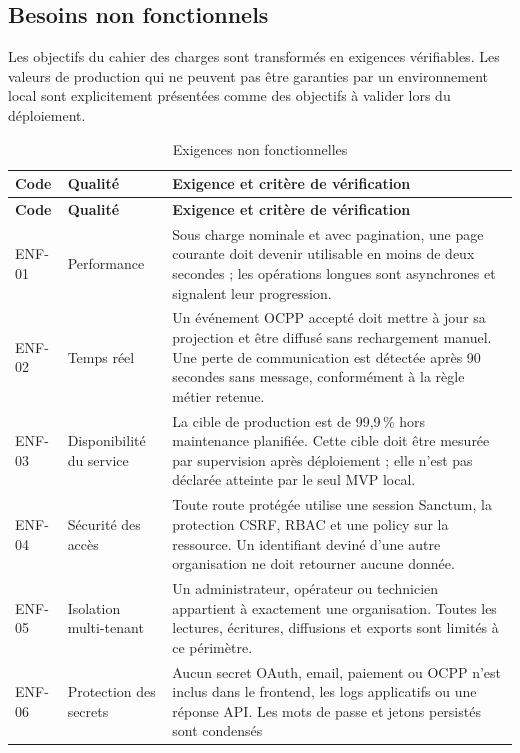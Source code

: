 \subsection{Besoins non fonctionnels}

Les objectifs du cahier des charges sont transformés en exigences vérifiables. Les
valeurs de production qui ne peuvent pas être garanties par un environnement local
sont explicitement présentées comme des objectifs à valider lors du déploiement.

\begin{longtable}{|C{1.45cm}|C{3.0cm}|p{9.2cm}|}
  \caption{Exigences non fonctionnelles}
  \label{tab:non-functional-requirements}\\
  \hline
  \textbf{Code} & \textbf{Qualité} & \textbf{Exigence et critère de vérification}\\
  \hline
  \endfirsthead
  \hline
  \textbf{Code} & \textbf{Qualité} & \textbf{Exigence et critère de vérification}\\
  \hline
  \endhead
  ENF-01 & Performance &
  Sous charge nominale et avec pagination, une page courante doit devenir utilisable
  en moins de deux secondes ; les opérations longues sont asynchrones et signalent
  leur progression.\\\hline
  ENF-02 & Temps réel &
  Un événement OCPP accepté doit mettre à jour sa projection et être diffusé sans
  rechargement manuel. Une perte de communication est détectée après 90 secondes
  sans message, conformément à la règle métier retenue.\\\hline
  ENF-03 & Disponibilité du service &
  La cible de production est de 99,9\,\% hors maintenance planifiée. Cette cible doit
  être mesurée par supervision après déploiement ; elle n'est pas déclarée atteinte
  par le seul MVP local.\\\hline
  ENF-04 & Sécurité des accès &
  Toute route protégée utilise une session Sanctum, la protection CSRF, RBAC et une
  policy sur la ressource. Un identifiant deviné d'une autre organisation ne doit
  retourner aucune donnée.\\\hline
  ENF-05 & Isolation multi-tenant &
  Un administrateur, opérateur ou technicien appartient à exactement une organisation.
  Toutes les lectures, écritures, diffusions et exports sont limités à ce périmètre.\\\hline
  ENF-06 & Protection des secrets &
  Aucun secret OAuth, email, paiement ou OCPP n'est inclus dans le frontend, les logs
  applicatifs ou une réponse API. Les mots de passe et jetons persistés sont condensés

\end{longtable}
